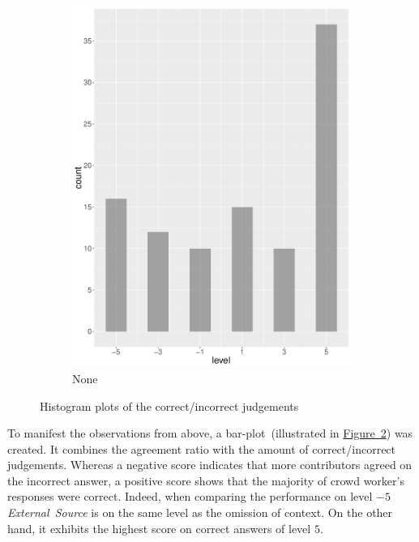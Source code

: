 \begin{figure}
\begin{subfigure}[b]{0.4\textwidth}
        \includegraphics[width=\textwidth]{plots/hist_level_none}
        \caption{None}
        \label{fig:hist_level_none}
    \end{subfigure}
    \caption{Histogram plots of the correct/incorrect judgements}\label{fig:hist_level_all}
\end{figure}

To manifest the observations from above, a bar-plot~(illustrated in \hyperref[fig:hist_level_all]{Figure~\ref*{fig:hist_level_all}}) was created. It combines the agreement ratio with the amount of correct/incorrect judgements. Whereas a negative score indicates that more contributors agreed on the incorrect answer, a positive score shows that the majority of crowd worker's responses were correct. Indeed, when comparing the performance on level $-5$ \emph{External~Source} is on the same level as the omission of context. On the other hand, it exhibits the highest score on correct answers of level $5$.

